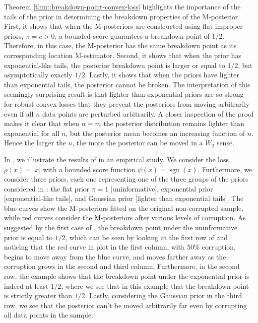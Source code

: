 \documentclass[11pt, oneside]{amsart}
\theoremstyle{definition}   %
\newcommand{\loss}{\rho}
\begin{document}
Theorem \ref{thm::breakdown-point-convex-loss} highlights the importance of the tails of the prior in determining the breakdown properties of the M-posterior. 
First, it shows that when the M-posteriors are constructed using flat improper priors, $\pi = c > 0$, a bounded score guarantees a breakdown point of $1/2$. Therefore, in this case, the M-posterior has the same breakdown point as its corresponding location M-estimator.  Second, it shows that when the prior has exponential-like tails, the posterior breakdown point is larger or equal to $1/2$, but asymptotically exactly $1/2$. 
Lastly, it shows that when the priors have lighter than exponential tails, the posterior cannot be broken. The interpretation of this seemingly surprising result is that lighter than exponential priors are so strong for robust convex losses that they prevent the posteriors from moving arbitrarily even if all $n$ data points are perturbed arbitrarily. A closer inspection of the proof makes it clear that when $n=m$ the posterior distribution remains lighter than exponential for all $n$, but the posterior mean becomes an increasing function of $n$. Hence the larger the $n$, the more the posterior can be moved in a $W_2$ sense.

In , we illustrate the results of  in an empirical study.  We consider the loss \( \loss(x) = |x|\) with a bounded score function \(\psi(x) = \operatorname{sgn}(x)\). Furthermore, we consider three priors, each one representing one of the three groups of the priors considered in : the flat prior \( \pi=1\) [uninformative], exponential prior [exponential-like tails], and Gaussian prior [lighter than exponential tails]. The blue curves show the M-posteriors fitted on the original non-corrupted sample, while red curves consider the M-posteriors after various levels of corruption.  As suggested by the first case of , the breakdown point under the uninformative prior is equal to \( 1/2\), which can be seen by looking at the first row of  and noticing that the red curve in plot in the first column, with 50\% corruption, begins to move away from the blue curve, and moves farther away as the corruption grows in the second and third column. Furthermore, in the second row, the example shows that the breakdown point under the exponential prior is indeed at least \( 1/2\), where we see that in this example that the breakdown point is strictly greater than \( 1/2\). Lastly, considering the Gaussian prior in the third row, we see that the posterior can't be moved arbitrarily far even by corrupting all data points in the sample.
\end{document}
